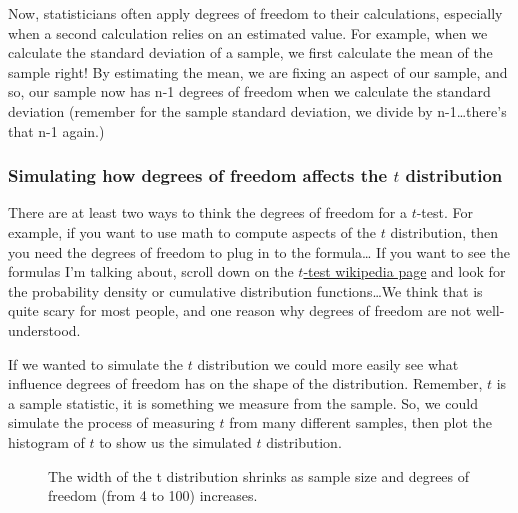 \documentclass[
  letterpaper,
  DIV=11,
  numbers=noendperiod]{scrreprt}
\begin{document}
Now, statisticians often apply degrees of freedom to their calculations,
especially when a second calculation relies on an estimated value. For
example, when we calculate the standard deviation of a sample, we first
calculate the mean of the sample right! By estimating the mean, we are
fixing an aspect of our sample, and so, our sample now has n-1 degrees
of freedom when we calculate the standard deviation (remember for the
sample standard deviation, we divide by n-1\ldots there's that n-1
again.)

\subsubsection{\texorpdfstring{Simulating how degrees of freedom affects
the \(t\)
distribution}{Simulating how degrees of freedom affects the t distribution}}\label{simulating-how-degrees-of-freedom-affects-the-t-distribution}

There are at least two ways to think the degrees of freedom for a
\(t\)-test. For example, if you want to use math to compute aspects of
the \(t\) distribution, then you need the degrees of freedom to plug in
to the formula\ldots{} If you want to see the formulas I'm talking
about, scroll down on the
\href{https://en.wikipedia.org/wiki/Student\%27s_t-distribution}{\(t\)-test
wikipedia page} and look for the probability density or cumulative
distribution functions\ldots We think that is quite scary for most
people, and one reason why degrees of freedom are not well-understood.

If we wanted to simulate the \(t\) distribution we could more easily see
what influence degrees of freedom has on the shape of the distribution.
Remember, \(t\) is a sample statistic, it is something we measure from
the sample. So, we could simulate the process of measuring \(t\) from
many different samples, then plot the histogram of \(t\) to show us the
simulated \(t\) distribution.

\begin{figure}


\caption{\label{fig-7dft}The width of the t distribution shrinks as
sample size and degrees of freedom (from 4 to 100) increases.}

\end{figure}%
\end{document}
